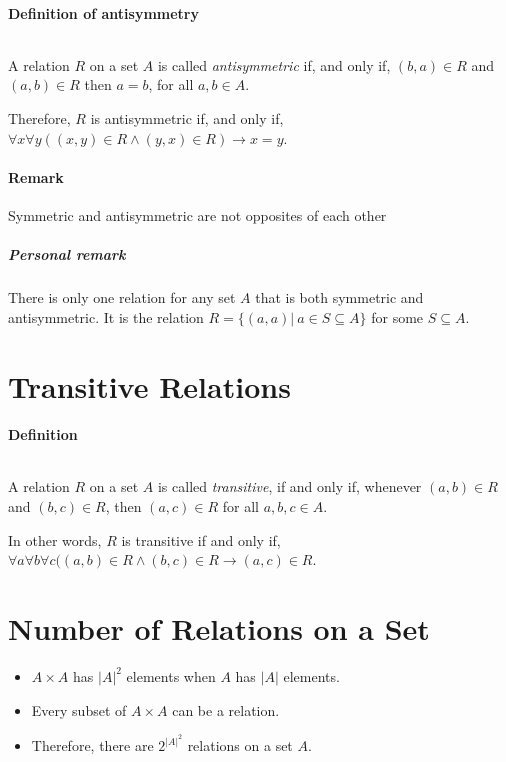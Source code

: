 \documentclass[10pt,a4paper]{book}
\begin{document}
\paragraph*{Definition of antisymmetry}
$\ $\par
A relation $R$ on a set $A$ is called \textit{antisymmetric} if, and only if, $(b,a) \in R$ and $(a,b) \in R$ then $a = b$, for all $a,b \in A$.\par
Therefore, $R$ is antisymmetric if, and only if, $\forall x \forall y ((x,y) \in R \land (y,x) \in R) \to x = y$.

\paragraph*{Remark}
Symmetric and antisymmetric are not opposites of each other
 
\subparagraph*{Personal remark}
There is only one relation for any set $A$ that is both symmetric and antisymmetric. It is the relation $R = \{(a,a)|\ a\in S\subseteq A\}$ for some $S\subseteq A$.

\section{Transitive Relations}

\paragraph*{Definition}
$\ $\par
A relation $R$ on a set $A$ is called \textit{transitive}, if and only if, whenever $(a,b) \in R$ and $(b,c) \in R$, then $(a,c) \in R$ for all $a,b,c \in A$.\par
In other words, $R$ is transitive if and only if, $\forall a \forall b \forall c ((a,b) \in R \land (b,c) \in R \to (a,c) \in R$.

\section{Number of Relations on a Set}
\begin{itemize}
\item $A \times A$ has $|A|^2$ elements when $A$ has $|A|$ elements.
\item Every subset of $A \times A$ can be a relation.
\item Therefore, there are $2^{{|A|}^2}$ relations on a set $A$.
\end{itemize}
\end{document}
